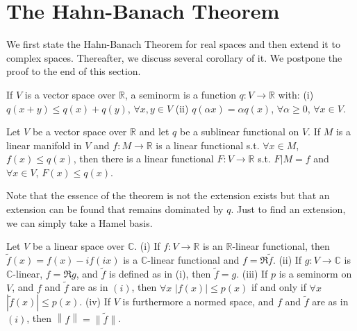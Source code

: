 \section{The Hahn-Banach Theorem}
We first state the Hahn-Banach Theorem for real spaces and then extend it to complex spaces. Thereafter,
we discuss several corollary of it. We postpone the proof to the end of this section.
\begin{definition}
    If $V$ is a vector space over $\mathbb{R}$, a seminorm is a function $q:V\to \mathbb{R}$ with:\newline 
    (i) $q(x+y)\le q(x)+q(y)$, $\forall x,y\in V$ \newline
    (ii) $q(\alpha x)=\alpha q(x)$, $\forall \alpha\ge 0$, $\forall x\in V$.
\end{definition}

\begin{theorem}
    Let $V$ be a vector space over $\mathbb{R}$ and let $q$ be a sublinear functional on $V$. If $M$ is a
    linear manifold in $V$ and $f:M\to\mathbb{R}$ is a linear functional s.t. $\forall x\in M$, $f(x)\le q(x)$,
    then there is a linear functional $F:V\to\mathbb{R}$ s.t. $F|M=f$ and $\forall x\in V$, $F(x)\le q(x)$.
\end{theorem}
Note that the essence of the theorem is not the extension exists but that an extension can be found that remains
dominated by $q$. Just to find an extension, we can simply take a Hamel basis.

\begin{lemma}[Complexification]
    Let $V$ be a linear space over $\mathbb{C}$.\newline 
    (i) If $f:V\to\mathbb{R}$ is an $\mathbb{R}$-linear functional, then $\tilde{f}(x)=f(x)-if(ix)$ is a
    $\mathbb{C}$-linear functional and $f=\Re \tilde{f}$. \newline 
    (ii) If $g:V\to\mathbb{C}$ is $\mathbb{C}$-linear, $f=\Re g$, and $\tilde{f}$ is defined as in (i), then 
    $\tilde{f}=g$. \newline
    (iii) If $p$ is a seminorm on $V$, and $f$ and $\tilde{f}$ are as in $(i)$, then $\forall x$ $\left|f(x)\right|\le p(x)$
    if and only if $\forall x$ $|\tilde{f}(x)|\le p(x)$.\newline 
    (iv) If $V$ is furthermore a normed space, and $f$ and $\tilde{f}$ are as in $(i)$, then 
    $\left\|f\right\|=\|\tilde{f}\|$.
\end{lemma}


\begin{theorem}
    
\end{theorem}

